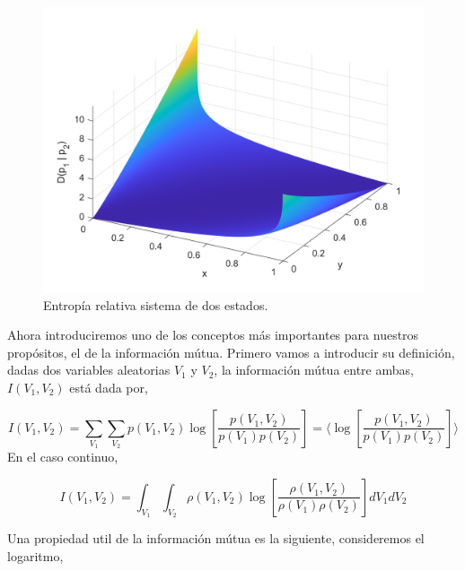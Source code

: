\documentclass[executivepaper,12pt]{article}
\numberwithin{equation}{section}
\begin{document}
\begin{figure}[H]
	\begin{center}
		\includegraphics[scale=1]{kullLeib}
	\end{center}
	\caption{Entropía relativa sistema de dos estados.}
	\label{fig-infor3}
\end{figure}



Ahora introduciremos uno de los conceptos más importantes para nuestros propósitos, el de la información mútua. Primero vamos a introducir su definición, dadas dos variables aleatorias $V_1$ y $V_2$, la información mútua entre ambas, $I(V_1,V_2)$ está dada por, 


\begin{equation}
	I(V_1,V_2)=\sum_{V_1}\sum_{V_2} p(V_1,V_2) \log\left[\frac{p(V_1,V_2)}{p(V_1)p(V_2)}\right] =\langle\log\left[\frac{p(V_1,V_2)}{p(V_1)p(V_2)}\right]\rangle
\end{equation} 
En el caso continuo,

\begin{equation}
		I(V_1,V_2)=\int_{V_1}\int_{V_2} \rho(V_1,V_2) \log\left[\frac{\rho(V_1,V_2)}{\rho(V_1)\rho(V_2)}\right]dV_1dV_2
\end{equation}

Una propiedad util de la información mútua es la siguiente, consideremos el logaritmo, 
\end{document}
